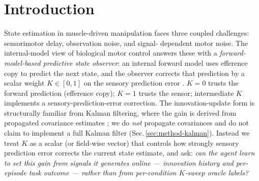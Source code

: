 \documentclass[sn-mathphys,NameDate,iicol]{sn-jnl}
\begin{document}

\maketitle

\section{Introduction}

State estimation in muscle-driven manipulation faces three coupled
challenges: sensorimotor delay, observation noise, and signal-%
dependent motor noise. The internal-model view of biological motor
control answers these with a \emph{forward-model-based predictive
state observer}: an internal forward model uses efference copy to
predict the next state, and the observer corrects that prediction by
a scalar weight $K\!\in\![0,1]$ on the sensory prediction error
\cite{bernstein1967,wolpert2000}. $K{=}0$ trusts the forward
prediction (efference copy); $K{=}1$ trusts the sensor; intermediate
$K$ implements a sensory-prediction-error correction. The
innovation-update form is structurally familiar from Kalman
filtering, where the gain is derived from propagated covariance
estimates \cite{kalman1960,mehra1970,anderson1979optimal}; we do
\emph{not} propagate covariances and do not claim to implement a
full Kalman filter (Sec.\,\ref{sec:method-kalman}). Instead we treat
$K$ as a scalar (or field-wise vector) that controls how strongly
sensory prediction error corrects the current state estimate, and
ask: \emph{can the agent learn to set this gain from signals it
generates online --- innovation history and per-episode task
outcome --- rather than from per-condition $K$-sweep oracle labels?}
\end{document}

